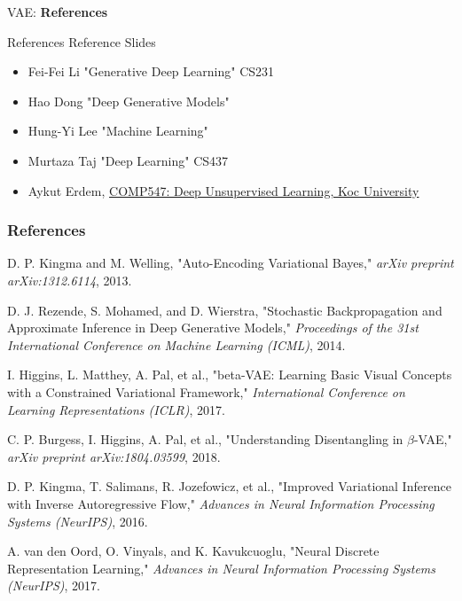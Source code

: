 \begin{frame}{}
	\LARGE VAE: \textbf{References}
\end{frame}

\begin{frame}[allowframebreaks]{References}
    Reference Slides
\begin{itemize}
    \item Fei-Fei Li "Generative Deep Learning" CS231
    \item Hao Dong "Deep Generative Models" 
    \item Hung-Yi Lee "Machine Learning" 
    \item Murtaza Taj "Deep Learning" CS437
    \item Aykut Erdem, \href{https://aykuterdem.github.io/classes/comp547.s24/}{COMP547: Deep Unsupervised Learning, Koc University}

\end{itemize}

\framebreak
    \frametitle{References}
    \begin{thebibliography}{99}
        D. P. Kingma and M. Welling,
        \newblock "Auto-Encoding Variational Bayes,"
        \newblock \emph{arXiv preprint arXiv:1312.6114}, 2013.

        D. J. Rezende, S. Mohamed, and D. Wierstra,
        \newblock "Stochastic Backpropagation and Approximate Inference in Deep Generative Models,"
        \newblock \emph{Proceedings of the 31st International Conference on Machine Learning (ICML)}, 2014.

        I. Higgins, L. Matthey, A. Pal, et al.,
        \newblock "beta-VAE: Learning Basic Visual Concepts with a Constrained Variational Framework,"
        \newblock \emph{International Conference on Learning Representations (ICLR)}, 2017.

        C. P. Burgess, I. Higgins, A. Pal, et al.,
        \newblock "Understanding Disentangling in $\beta$-VAE,"
        \newblock \emph{arXiv preprint arXiv:1804.03599}, 2018.

        D. P. Kingma, T. Salimans, R. Jozefowicz, et al.,
        \newblock "Improved Variational Inference with Inverse Autoregressive Flow,"
        \newblock \emph{Advances in Neural Information Processing Systems (NeurIPS)}, 2016.

        A. van den Oord, O. Vinyals, and K. Kavukcuoglu,
        \newblock "Neural Discrete Representation Learning,"
        \newblock \emph{Advances in Neural Information Processing Systems (NeurIPS)}, 2017.


\end{thebibliography}
\end{frame}

